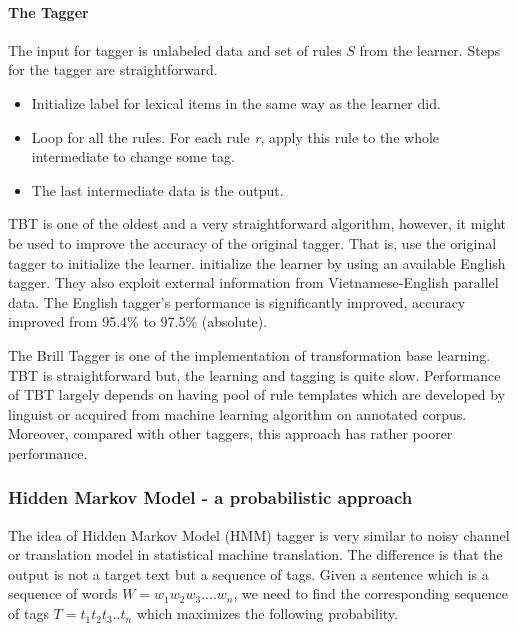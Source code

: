 \paragraph{The Tagger} The input for tagger is unlabeled data and set of rules $S$ from the learner. Steps for the tagger are straightforward. 
\begin{itemize}
\item Initialize label for lexical items in the same way as the learner did.
\item Loop for all the rules. For each rule \textit{r}, apply this rule to the whole intermediate to change some tag. 
\item The last intermediate data is the output. 
\end{itemize}

TBT is one of the oldest and a very straightforward algorithm, however, it might be used to improve the accuracy of the original tagger. That is, use the original tagger to initialize the learner.  initialize the learner by using an available English tagger. They also exploit external information from Vietnamese-English parallel data. The English tagger's performance is significantly improved, accuracy improved from 95.4\% to 97.5\% (absolute). 

The Brill Tagger \cite{Brill95transformation} is one of the implementation of transformation base learning. TBT is straightforward but, the learning and tagging is quite slow. Performance of TBT largely depends on having pool of rule templates which are developed by linguist or acquired from machine learning algorithm on annotated corpus. Moreover, compared with other taggers, this approach has rather poorer performance. 

\subsubsection{Hidden Markov Model - a probabilistic approach}
The idea of Hidden Markov Model (HMM) tagger is very similar to noisy channel or translation model in statistical machine translation. The difference is that the output is not a target text but a sequence of tags. Given a sentence which is a sequence of words $W = w_1w_2w_3....w_n$, we need to find the corresponding sequence of tags $T = t_1t_2t_3..t_n$ which maximizes the following probability. 

